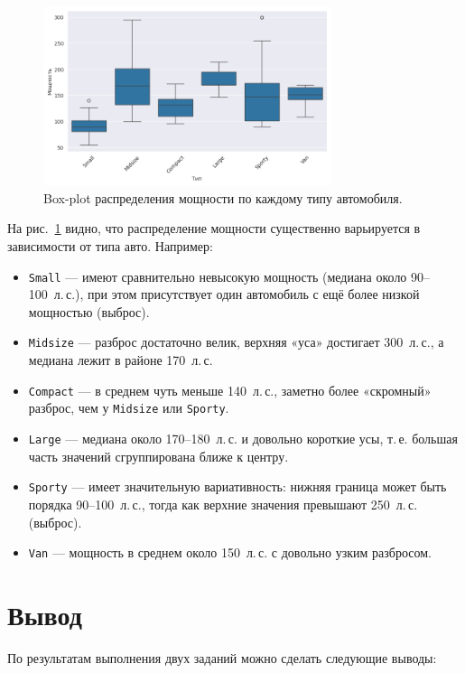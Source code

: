 \documentclass[a4paper,12pt]{article}
\begin{document}
\begin{figure}[H]
    \centering
    \includegraphics[width=0.75\textwidth]{images/boxplot_types.png}
    \caption{Box-plot распределения мощности по каждому типу автомобиля.}
    \label{fig:boxplot_types}
\end{figure}

\noindent
На рис.~\ref{fig:boxplot_types} видно, что распределение мощности существенно варьируется в зависимости от типа авто. Например:
\begin{itemize}
    \item \texttt{Small} --- имеют сравнительно невысокую мощность (медиана около 90--100~л.\,с.), при этом присутствует один автомобиль с ещё более низкой мощностью (выброс).
    \item \texttt{Midsize} --- разброс достаточно велик, верхняя «уса» достигает 300~л.\,с., а медиана лежит в районе 170~л.\,с.
    \item \texttt{Compact} --- в среднем чуть меньше 140~л.\,с., заметно более «скромный» разброс, чем у \texttt{Midsize} или \texttt{Sporty}.
    \item \texttt{Large} --- медиана около 170--180~л.\,с. и довольно короткие усы, т.\,е. большая часть значений сгруппирована ближе к центру.
    \item \texttt{Sporty} --- имеет значительную вариативность: нижняя граница может быть порядка 90--100~л.\,с., тогда как верхние значения превышают 250~л.\,с. (выброс).
    \item \texttt{Van} --- мощность в среднем около 150~л.\,с. с довольно узким разбросом.
\end{itemize}

\section*{Вывод}

По результатам выполнения двух заданий можно сделать следующие выводы:
\end{document}
